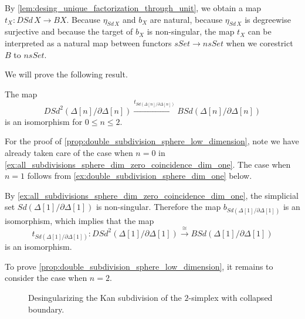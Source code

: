 By \cref{lem:desing_unique_factorization_through_unit}, we obtain a map $t_X:DSd\, X\to BX$. Because $\eta _{Sd\, X}$ and $b_X$ are natural, because $\eta _{Sd\, X}$ is degreewise surjective and because the target of $b_X$ is non-singular, the map $t_X$ can be interpreted as a natural map between functors $sSet\to nsSet$ when we corestrict $B$ to $nsSet$.

We will prove the following result.
\begin{proposition}\label{prop:double_subdivision_sphere_low_dimension}
The map
\[DSd^2(\Delta [n]/\partial \Delta [n])\xrightarrow{t_{Sd(\Delta [n]/\partial \Delta [n])}} BSd(\Delta [n]/\partial \Delta [n])\]
is an isomorphism for $0\leq n\leq 2$.
\end{proposition}
\noindent For the proof of \cref{prop:double_subdivision_sphere_low_dimension}, note we have already taken care of the case when $n=0$ in \cref{ex:all_subdivisions_sphere_dim_zero_coincidence_dim_one}. The case when $n=1$ follows from \cref{ex:double_subdivision_sphere_dim_one} below.
\begin{example}\label{ex:double_subdivision_sphere_dim_one}
By \cref{ex:all_subdivisions_sphere_dim_zero_coincidence_dim_one}, the simplicial set $Sd(\Delta [1]/\partial \Delta [1])$ is non-singular. Therefore the map $b_{Sd(\Delta [1]/\partial \Delta [1])}$ is an isomorphism, which implies that the map
\[t_{Sd(\Delta [1]/\partial \Delta [1])}:DSd^2(\Delta [1]/\partial \Delta [1])\xrightarrow{\cong } BSd(\Delta [1]/\partial \Delta [1])\]
is an isomorphism.
\end{example}
\noindent To prove \cref{prop:double_subdivision_sphere_low_dimension}, it remains to consider the case when $n=2$.

\begin{figure}
\centering
{}
\caption{Desingularizing the Kan subdivision of the $2$-simplex with collapsed boundary.}
\label{fig:ch2_Desing_singlysubd_2simpl}
\end{figure}

